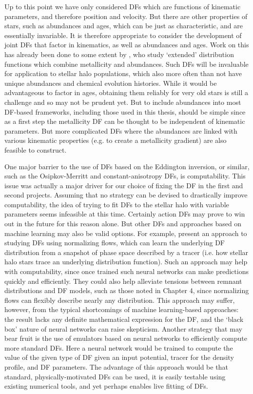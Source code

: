 Up to this point we have only considered DFs which are functions of kinematic parameters, and therefore position and velocity. But there are other properties of stars, such as abundances and ages, which can be just as characteristic, and are essentially invariable. It is therefore appropriate to consider the development of joint DFs that factor in kinematics, as well as abundances and ages. Work on this has already been done to some extent by \textcite{sanders15b}, who study `extended' distribution functions which combine metallicity and abundances. Such DFs will be invaluable for application to stellar halo populations, which also more often than not have unique abundances and chemical evolution histories. While it would be advantageous to factor in ages, obtaining them reliably for very old stars is still a challenge and so may not be prudent yet. But to include abundances into most DF-based frameworks, including those used in this thesis, should be simple since as a first step the metallicity DF can be thought to be independent of kinematic parameters. But more complicated DFs where the abundances are linked with various kinematic properties (e.g. to create a metallicity gradient) are also feasible to construct.

One major barrier to the use of DFs based on the Eddington inversion, or similar, such as the Osipkov-Merritt and constant-anisotropy DFs, is computability. This issue was actually a major driver for our choice of fixing the DF in the first and second projects. Assuming that no strategy can be devised to drastically improve computability, the idea of trying to fit DFs to the stellar halo with variable parameters seems infeasible at this time. Certainly action DFs may prove to win out in the future for this reason alone. But other DFs and approaches based on machine learning may also be valid options. For example, \textcite{green23} present an approach to studying DFs using normalizing flows, which can learn the underlying DF distribution from a snapshot of phase space described by a tracer (i.e. how stellar halo stars trace an underlying distribution function). Such an approach may help with computability, since once trained such neural networks can make predictions quickly and efficiently. They could also help alleviate tensions between remnant distributions and DF models, such as those noted in Chapter 4, since normalizing flows can flexibly describe nearly any distribution. This approach may suffer, however, from the typical shortcomings of machine learning-based approaches: the result lacks any definite mathematical expression for the DF, and the `black box' nature of neural networks can raise skepticism. Another strategy that may bear fruit is the use of emulators based on neural networks to efficiently compute more standard DFs. Here a neural network would be trained to compute the value of the given type of DF given an input potential, tracer for the density profile, and DF parameters. The advantage of this approach would be that standard, physically-motivated DFs can be used, it is easily testable using existing numerical tools, and yet perhaps enables live fitting of DFs.

